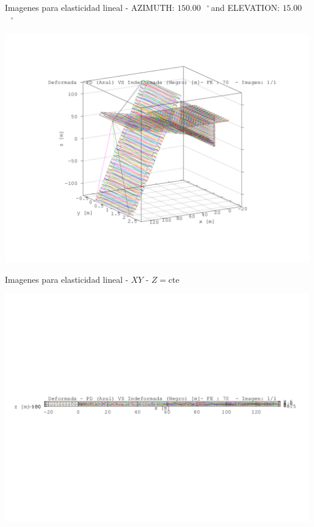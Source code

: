 \documentclass[a4paper,11pt]{article}
\newcommand{\grad}{\hspace{-2.5mm}$\,\phantom{a}^{\circ}\,$}
\begin{document}
\newpage       
\begin{center}       
Imagenes para elasticidad lineal - AZIMUTH: $150.00$\grad and ELEVATION: $ 15.00$\grad

\includegraphics[width=.80\textwidth]{../../deformada/grua_deformada_1.png}      

\end{center}       
\newpage       
\begin{center}       
Imagenes para elasticidad lineal -  $XY$ - $Z=\text{cte}$ 

\includegraphics[width=.80\textwidth]{../../XY_XZ_YZ/XY/deformada/grua_deformada_XY_1.png}      

\end{center}       
\newpage       
\end{document}
